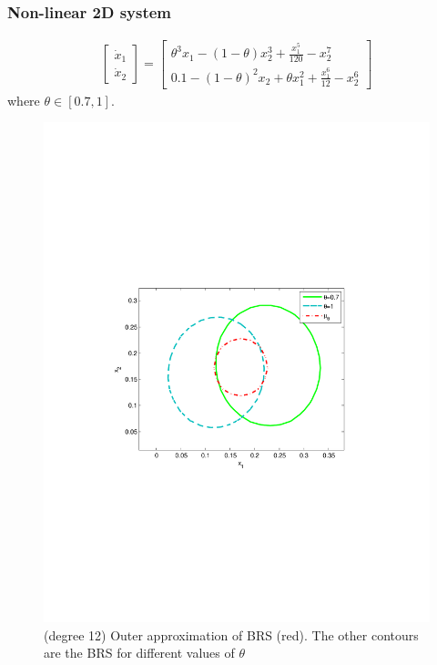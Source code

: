 \documentclass[10pt]{scrartcl}
\theoremstyle{remark}
\begin{document}
\subsubsection{Non-linear 2D system}
\begin{align}
	 \begin{bmatrix}\dot x_1\\\dot x_2
	\end{bmatrix}
	=
	\begin{bmatrix}
	\theta^3x_1-(1-\theta)x_2^3+\frac{x_1^5}{120}-x_2^7\\
    0.1-(1-\theta)^2x_2+\theta x_1^2+\frac{x_1^6}{12}-x_2^6
	\end{bmatrix}
\end{align}
where $\theta\in [0.7,1]$.
\begin{figure}[!ht]
\centering
\includegraphics[trim=1.5in 3.3in 1.5in 3.5in, width=.5\columnwidth]{figures/2D_2}%
\caption{(degree 12) Outer approximation of BRS (red). The other contours are the BRS for different values of $\theta$}%
\end{figure}

\newpage
\end{document}

